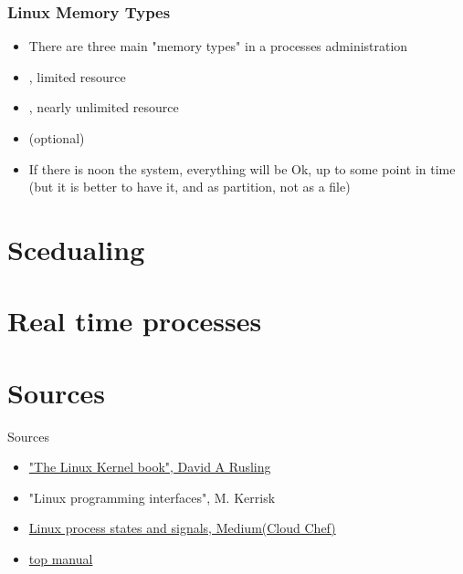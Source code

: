 \documentclass[usenames,dvipsnames,10pt,aspectratio=169]{beamer}
\begin{document}

\begin{frame}
    \frametitle{Linux Memory Types}
    \begin{itemize}
        \item There are three main "memory types" in a processes administration
        \item {}, limited resource
        \item {}, nearly unlimited resource
        \item {} (optional)
        \item If there is noon the system, everything will be Ok, up to some point in time (but it is better to have it, and as partition, not as a file)
    \end{itemize}
    

\end{frame}


\section{Scedualing}

\section{Real time processes}

\section{Sources}
\begin{frame}{Sources}
    \begin{itemize}
        \item \href{https://tldp.org/LDP/tlk/tlk-toc.html}{"The Linux Kernel book", David A Rusling}
        \item "Linux programming interfaces", M. Kerrisk
        \item \href{https://cloudchef.medium.com/linux-process-states-and-signals-a967d18fab64}{Linux process states and signals, Medium(Cloud Chef)}
        \item \href{https://man7.org/linux/man-pages/man1/top.1.html}{top manual}
    \end{itemize}
\end{frame}
\end{document}
